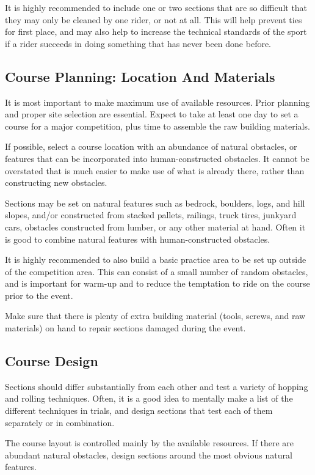 It is highly recommended to include one or two sections that are so difficult that they may only be cleaned by one rider, or not at all. 
This will help prevent ties for first place, and may also help to increase the technical standards of the sport if a rider succeeds in doing something that has never been done before.

\subsection{Course Planning: Location And Materials}
It is most important to make maximum use of available resources. 
Prior planning and proper site selection are essential.
Expect to take at least one day to set a course for a major competition, plus time to assemble the raw building materials.

If possible, select a course location with an abundance of natural obstacles, or features that can be incorporated into human-constructed obstacles. 
It cannot be overstated that is much easier to make use of what is already there, rather than constructing new obstacles.

Sections may be set on natural features such as bedrock, boulders, logs, and hill slopes, and/or constructed from stacked pallets, railings, truck tires, junkyard cars, obstacles constructed from lumber, or any other material at hand. 
Often it is good to combine natural features with human-constructed obstacles.

It is highly recommended to also build a basic practice area to be set up outside of the competition area. 
This can consist of a small number of random obstacles, and is important for warm-up and to reduce the temptation to ride on the course prior to the event.

Make sure that there is plenty of extra building material (tools, screws, and raw materials) on hand to repair sections damaged during the event.

\subsection{Course Design}
Sections should differ substantially from each other and test a variety of hopping and rolling techniques. 
Often, it is a good idea to mentally make a list of the different techniques in trials, and design sections that test each of them
separately or in combination.

The course layout is controlled mainly by the available resources.
If there are abundant natural obstacles, design sections around the most obvious natural features.

